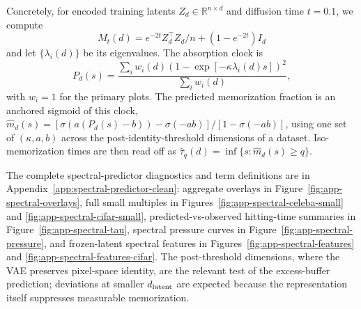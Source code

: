 Concretely, for encoded training latents $Z_d\in\mathbb R^{n\times d}$ and diffusion time $t=0.1$, we compute \[ M_t(d)=e^{-2t}Z_d^\top Z_d/n+(1-e^{-2t})I_d \] and let $\{\lambda_i(d)\}$ be its eigenvalues. The absorption clock is \[ P_d(s)= \frac{\sum_i w_i(d)\left(1-\exp[-\kappa\lambda_i(d)s]\right)^2} {\sum_i w_i(d)}, \] with $w_i=1$ for the primary plots. The predicted memorization fraction is an anchored sigmoid of this clock, $\widehat m_d(s)=[\sigma(a(P_d(s)-b))-\sigma(-ab)]/[1-\sigma(-ab)]$, using one set of $(\kappa,a,b)$ across the post-identity-threshold dimensions of a dataset. Iso-memorization times are then read off as $\hat\tau_q(d)=\inf\{s:\widehat m_d(s)\ge q\}$.

The complete spectral-predictor diagnostics and term definitions are in Appendix~\ref{app:spectral-predictor-clean}: aggregate overlays in Figure~\ref{fig:app-spectral-overlays}, full small multiples in Figures~\ref{fig:app-spectral-celeba-small} and \ref{fig:app-spectral-cifar-small}, predicted-vs-observed hitting-time summaries in Figure~\ref{fig:app-spectral-tau}, spectral pressure curves in Figure~\ref{fig:app-spectral-pressure}, and frozen-latent spectral features in Figures~\ref{fig:app-spectral-features} and \ref{fig:app-spectral-features-cifar}. The post-threshold dimensions, where the VAE preserves pixel-space identity, are the relevant test of the excess-buffer prediction; deviations at smaller $d_{\mathrm{latent}}$ are expected because the representation itself suppresses measurable memorization.
